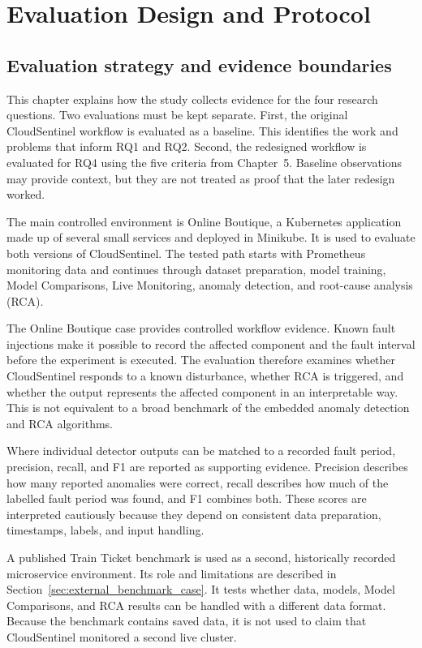 \chapter{Evaluation Design and Protocol}
\label{ch:evaluation_design}

\section{Evaluation strategy and evidence boundaries}
This chapter explains how the study collects evidence for the four research questions. Two evaluations must be kept separate. First, the original CloudSentinel workflow is evaluated as a baseline. This identifies the work and problems that inform RQ1 and RQ2. Second, the redesigned workflow is evaluated for RQ4 using the five criteria from Chapter~5. Baseline observations may provide context, but they are not treated as proof that the later redesign worked.

The main controlled environment is Online Boutique, a Kubernetes application made up of several small services and deployed in Minikube. It is used to evaluate both versions of CloudSentinel. The tested path starts with Prometheus monitoring data and continues through dataset preparation, model training, Model Comparisons, Live Monitoring, anomaly detection, and root-cause analysis (RCA).

The Online Boutique case provides controlled workflow evidence. Known fault injections make it possible to record the affected component and the fault interval before the experiment is executed. The evaluation therefore examines whether CloudSentinel responds to a known disturbance, whether RCA is triggered, and whether the output represents the affected component in an interpretable way. This is not equivalent to a broad benchmark of the embedded anomaly detection and RCA algorithms.

Where individual detector outputs can be matched to a recorded fault period, precision, recall, and F1 are reported as supporting evidence. Precision describes how many reported anomalies were correct, recall describes how much of the labelled fault period was found, and F1 combines both. These scores are interpreted cautiously because they depend on consistent data preparation, timestamps, labels, and input handling.

A published Train Ticket benchmark is used as a second, historically recorded microservice environment. Its role and limitations are described in Section~\ref{sec:external_benchmark_case}. It tests whether data, models, Model Comparisons, and RCA results can be handled with a different data format. Because the benchmark contains saved data, it is not used to claim that CloudSentinel monitored a second live cluster.

